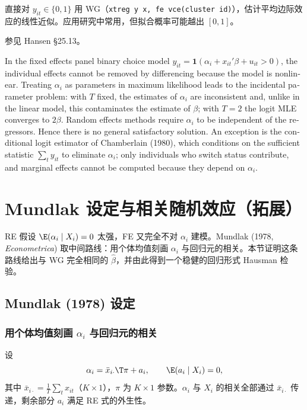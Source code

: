 直接对 $y_{it}\in\{0,1\}$ 用 WG（\texttt{xtreg y x, fe vce(cluster id)}），估计平均边际效应的线性近似。应用研究中常用，但拟合概率可能越出 $[0,1]$。

参见 Hansen §25.13。

\begin{english}
In the fixed effects panel binary choice model $y_{it}=\mathbf{1}(\alpha_i+x_{it}'\beta+u_{it}>0)$, the individual effects cannot be removed by differencing because the model is nonlinear. Treating $\alpha_i$ as parameters in maximum likelihood leads to the incidental parameter problem: with $T$ fixed, the estimates of $\alpha_i$ are inconsistent and, unlike in the linear model, this contaminates the estimate of $\beta$; with $T=2$ the logit MLE converges to $2\beta$. Random effects methods require $\alpha_i$ to be independent of the regressors. Hence there is no general satisfactory solution. An exception is the conditional logit estimator of Chamberlain (1980), which conditions on the sufficient statistic $\sum_t y_{it}$ to eliminate $\alpha_i$; only individuals who switch status contribute, and marginal effects cannot be computed because they depend on $\alpha_i$.
\end{english}

\section{Mundlak 设定与相关随机效应（拓展）}\label{sec:U11b-mundlak}

RE 假设 $\E(\alpha_i\mid X_i)=0$ 太强，FE 又完全不对 $\alpha_i$ 建模。Mundlak (1978, \emph{Econometrica}) 取中间路线：用个体均值刻画 $\alpha_i$ 与回归元的相关。本节证明这条路线给出与 WG 完全相同的 $\hat\beta$，并由此得到一个稳健的回归形式 Hausman 检验。

\subsection{Mundlak (1978) 设定}

\subsubsection{用个体均值刻画 \texorpdfstring{$\alpha_i$}{alpha\_i} 与回归元的相关}

设
\[
\alpha_i=\bar x_{i\cdot}\T\pi+a_i,\qquad \E(a_i\mid X_i)=0,
\]
其中 $\bar x_{i\cdot}=\frac1T\sum_tx_{it}$（$K\times1$），$\pi$ 为 $K\times1$ 参数。$\alpha_i$ 与 $X_i$ 的相关全部通过 $\bar x_{i\cdot}$ 传递，剩余部分 $a_i$ 满足 RE 式的外生性。

